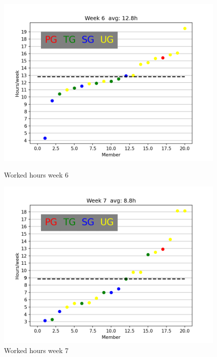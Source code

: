 \documentclass{article}
\begin{document}
        \begin{figure}[!htb]
            \endminipage\hfill
              \includegraphics[width=\linewidth]{images/week_6.png}
              \caption{Worked hours week 6}\label{fig:week6}
            \endminipage\hfill
              \includegraphics[width=\linewidth]{images/week_7.png}
              \caption{Worked hours week 7}\label{fig:week7}
            \endminipage\hfill
            \endminipage\hfill
        \end{figure}
        
\end{document}
